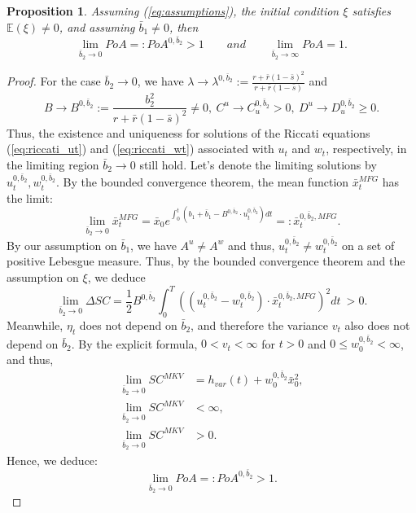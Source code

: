 \documentclass[11pt]{article}
\newtheorem{proposition}{Proposition}
\begin{document}
\begin{proposition}
	Assuming (\ref{eq:assumptions}), the initial condition $\xi$ satisfies $\mathbb{E}(\xi)\neq 0$, and assuming $\bar{b}_1\neq 0$, then 
	\begin{equation*}
	\lim_{\bar{b}_2 \to 0} PoA =: PoA^{0,\bar{b}_2} > 1\qquad and \qquad\lim_{\bar{b}_2 \to \infty} PoA = 1.
	\end{equation*}
	\label{prop:b2bar}
\end{proposition}
\begin{proof}
	For the case $\bar{b}_2 \to 0$, we have $\displaystyle \lambda \to \lambda^{0,\bar{b}_2} := \frac{r + \bar{r}(1- \bar{s})^2}{r + \bar{r}(1-\bar{s})}$
	and 
	$$B \to B^{0,\bar{b}_2} := \frac{b_2^2}{r + \bar{r}(1-\bar{s})^2} \neq 0,\ C^u \to C^{0,\bar{b}_2}_u >0 ,\ D^u \to D^{0,\bar{b}_2}_u \geq 0.$$
	Thus, the existence and uniqueness for solutions of the Riccati equations (\ref{eq:riccati_ut}) and (\ref{eq:riccati_wt}) associated with $u_t$ and $w_t$, respectively, in the limiting region $\bar{b}_2 \to 0$ still hold. Let's denote the limiting solutions by 
	$u^{0,\bar{b}_2}_t, w^{0,\bar{b}_2}_t$. By the bounded convergence theorem, the mean function $\bar{x}_t^{MFG}$ has the limit:
   	$$\lim_{\bar{b}_2 \to 0} \bar{x}_t^{MFG} = \bar{x}_0 e^{\int_0^t (b_1 + \bar{b}_1 - B^{0,\bar{b}_2}\cdot u^{0,\bar{b}_2}_t) dt} =: \bar{x}^{0,\bar{b}_2,MFG}_t.$$ 
   	By our assumption on $\bar{b}_1$, we have $A^u \neq A^w$ and thus, $u^{0,\bar{b}_2}_t\neq w^{0,\bar{b}_2}_t$ on a set of positive Lebesgue measure.
   	Thus, by the bounded convergence theorem and the assumption on $\xi$, we deduce
	$$ \lim_{\bar{b}_2 \to 0} \Delta SC = \frac{1}{2} B^{0,\bar{b}_2} \int_0^T \left( (u_t^{0,\bar{b}_2} - w_t^{0,\bar{b}_2})\cdot \bar{x}_t^{0,\bar{b}_2,MFG} \right)^2 dt \  > 0. $$
	Meanwhile, $\eta_t$ does not depend on $\bar{b}_2$, and therefore the variance $v_t$ also does not depend on $\bar{b}_2$. By the explicit formula, $0<v_t<\infty$ for $t>0$ and $0 \leq w^{0,\bar{b}_2}_0 < \infty$, and thus,
	\begin{equation*}
    \begin{split}
	    \lim_{\bar{b}_2 \to 0}SC^{MKV} &= h_{var}(t) + w^{0,\bar{b}_2}_0 \bar{x}_0^2, \\
	    \lim_{\bar{b}_2 \to 0}SC^{MKV}&<\infty, \\
	    \lim_{\bar{b}_2 \to 0}SC^{MKV}&>0 .       
    \end{split}
	\end{equation*}
	Hence, we deduce:
	$$ \lim_{\bar{b}_2 \to 0} PoA =: PoA^{0,\bar{b}_2} > 1. $$
	

\end{proof}
\end{document}
